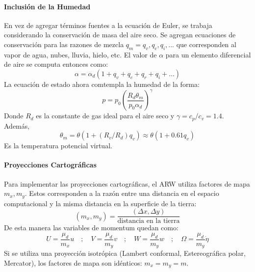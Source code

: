 \paragraph{Inclusión de la Humedad} En vez de agregar términos fuentes a la ecuación de Euler, se trabaja considerando la conservación de masa del aire seco. Se agregan ecuaciones de conservación para las razones de mezcla $q_m=q_v,q_c,q_i,...$ que corresponden al vapor de agua, nubes, lluvia, hielo, etc. El valor de $\alpha$ para un elemento diferencial de aire se computa entonces como:
\begin{equation}
\alpha = \alpha_d(1+q_v+q_c+q_r+q_i+...)
\end{equation}
La ecuación de estado ahora comtempla la humedad de la forma:
\begin{equation}\label{eq:04_gasideal}
p = p_0\left(\frac{R_d \theta_m}{p_0 \alpha_d}\right)^\gamma
\end{equation}
Donde $R_d$ es la constante de gas ideal para el aire seco y $\gamma = c_p/c_v = 1.4$. Además,
\begin{equation}
\theta_m = \theta(1+(R_v/R_d)q_v)\approx\theta(1+0.61q_v)
\end{equation}
Es la temperatura potencial virtual.
\paragraph{Proyecciones Cartográficas} Para implementar las proyecciones cartográficas, el ARW utiliza factores de mapa $m_x,m_y$. Estos corresponden a la razón entre una distancia en el espacio computacional y la misma distancia en la superficie de la tierra:
\begin{equation}
(m_x,m_y) = \frac{(\Delta x, \Delta y)}{\text{distancia en la tierra}}
\end{equation}
De esta manera las variables de momentum quedan como:
\begin{equation}
U = \frac{\mu_d}{m_x}u\quad;\quad V = \frac{\mu_d}{m_y}v\quad;\quad W = \frac{\mu_d}{m_y}w\quad;\quad \Omega = \frac{\mu_d}{m_y}\dot{\eta}
\end{equation}
Si se utiliza una proyección isotrópica (Lambert conformal, Estereográfica polar, Mercator), los factores de mapa son idénticos: $m_x=m_y = m$.
